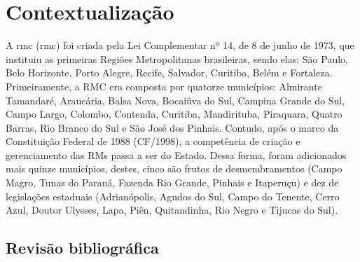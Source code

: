 	
	
	\tableofcontents 
	\newpage \listoffigures
	\newpage \listoftables
	\textual
	
	
	
	
	\chapter{Contextualização}
	
	A \glsdesc{rmc} (\gls{rmc}) foi criada pela Lei Complementar  nº 14, de 8 de junho de 1973, que instituiu as primeiras Regiões Metropolitanas brasileiras, sendo elas: São Paulo, Belo Horizonte, Porto Alegre, Recife, Salvador, Curitiba, Belém e Fortaleza. Primeiramente, a RMC era composta por quatorze municípios: Almirante Tamandaré, Araucária, Balsa Nova, Bocaiúva do Sul, Campina Grande do Sul, Campo Largo, Colombo, Contenda, Curitiba, Mandirituba, Piraquara, Quatro Barras, Rio Branco do Sul e São José dos Pinhais. Contudo, após o marco da Constituição Federal de 1988 (CF/1998), a competência de criação e gerenciamento das RMs passa a ser do Estado. Dessa forma, foram adicionados mais quinze municípios, destes, cinco são frutos de desmembramentos (Campo Magro, Tunas do Paraná, Fazenda Rio Grande, Pinhais e Itaperuçu) e dez de legislações estaduais (Adrianópolis, Agudos do Sul, Campo do Tenente, Cerro Azul, Doutor Ulysses, Lapa, Piên, Quitandinha, Rio Negro e Tijucas do Sul).
	
	\section{Revisão bibliográfica}
	
